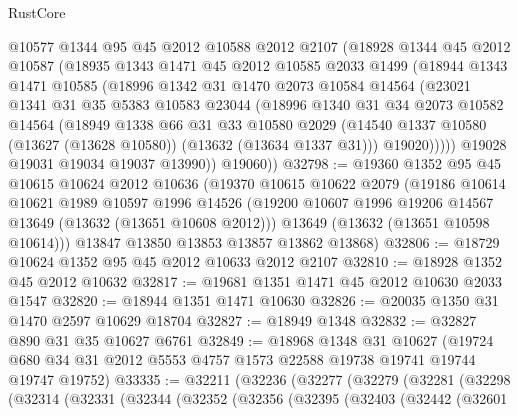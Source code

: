 \begin{lexlean}{RustCore}
\begin{coremodule}
        @10577
        @1344
        @95
        @45
        @2012
        @10588
        @2012
        @2107
        (@18928
          @1344
          @45
          @2012
          @10587
          (@18935
            @1343
            @1471
            @45
            @2012
            @10585
            @2033
            @1499
            (@18944
              @1343
              @1471
              @10585
              (@18996
                @1342
                @31
                @1470
                @2073
                @10584
                @14564
                (@23021
                  @1341
                  @31
                  @35
                  @5383
                  @10583
                  @23044
                  (@18996
                    @1340
                    @31
                    @34
                    @2073
                    @10582
                    @14564
                    (@18949
                      @1338
                      @66
                      @31
                      @33
                      @10580
                      @2029
                      (@14540 @1337 @10580 (@13627 (@13628 @10580)) (@13632 (@13634 @1337 @31)))
                      @19020)))))
            @19028
            @19031
            @19034
            @19037
            @13990))
        @19060))
@32798 := @19360
    @1352
    @95
    @45
    @10615
    @10624
    @2012
    @10636
    (@19370
      @10615
      @10622
      @2079
      (@19186
        @10614
        @10621
        @1989
        @10597
        @1996
        @14526
        (@19200 @10607 @1996 @19206 @14567 @13649 (@13632 (@13651 @10608 @2012)))
        @13649
        (@13632 (@13651 @10598 @10614)))
      @13847
      @13850
      @13853
      @13857
      @13862
      @13868)
@32806 := @18729 @10624 @1352 @95 @45 @2012 @10633 @2012 @2107
@32810 := @18928 @1352 @45 @2012 @10632
@32817 := @19681 @1351 @1471 @45 @2012 @10630 @2033 @1547
@32820 := @18944 @1351 @1471 @10630
@32826 := @20035 @1350 @31 @1470 @2597 @10629 @18704
@32827 := @18949 @1348
@32832 := @32827 @890 @31 @35 @10627 @6761
@32849 := @18968
    @1348
    @31
    @10627
    (@19724 @680 @34 @31 @2012 @5553 @4757 @1573 @22588 @19738 @19741 @19744 @19747 @19752)
@33335 := @32211
    (@32236
      (@32277
        (@32279
          (@32281
            (@32298
              (@32314
                (@32331
                  (@32344
                    (@32352
                      (@32356
                        (@32395
                          (@32403
                            (@32442
                              (@32601

\end{coremodule}
\end{lexlean}
